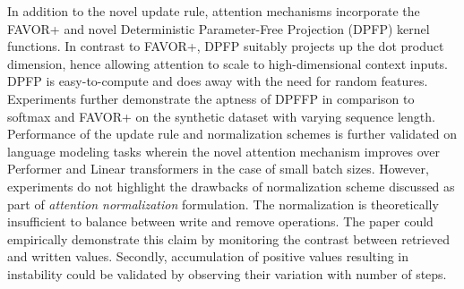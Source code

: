 \documentclass[11pt,letterpaper]{article}
\begin{document}
In addition to the novel update rule, attention mechanisms incorporate the FAVOR+ and novel Deterministic Parameter-Free Projection (DPFP) kernel functions. In contrast to FAVOR+, DPFP suitably projects up the dot product dimension, hence allowing attention to scale to high-dimensional context inputs. DPFP is easy-to-compute and does away with the need for random features. Experiments further demonstrate the aptness of DPFFP in comparison to softmax and FAVOR+ on the synthetic dataset with varying sequence length. Performance of the update rule and normalization schemes is further validated on language modeling tasks wherein the novel attention mechanism improves over Performer and Linear transformers in the case of small batch sizes. However, experiments do not highlight the drawbacks of normalization scheme discussed as part of \textit{attention normalization} formulation. The normalization is theoretically insufficient to balance between write and remove operations. The paper could empirically demonstrate this claim by monitoring the contrast between retrieved and written values. Secondly, accumulation of positive values resulting in instability could be validated by observing their variation with number of steps. 
\end{document}
